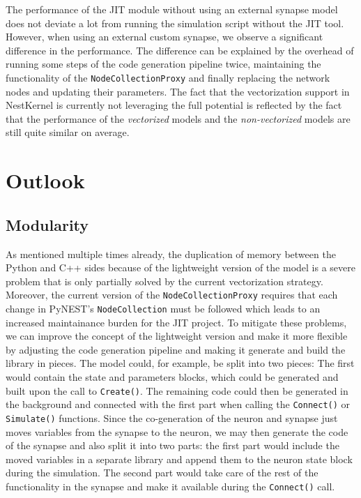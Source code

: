 The performance of the JIT module without using an external synapse model does not deviate a lot from running the simulation script without the JIT tool. However, when using an external custom synapse, we observe a significant difference in the performance. The difference can be explained by the overhead of running some steps of the code generation pipeline twice, maintaining the functionality of the \texttt{NodeCollectionProxy} and finally replacing the network nodes and updating their parameters. The fact that the vectorization support in NestKernel is currently not leveraging the full potential is reflected by the fact that the performance of the \emph{vectorized} models and the \emph{non-vectorized} models are still quite similar on average.

\section{Outlook}

\subsection*{Modularity}

As mentioned multiple times already, the duplication of memory between the Python and C++ sides because of the lightweight version of the model is a severe problem that is only partially solved by the current vectorization strategy. Moreover, the current version of the \texttt{NodeCollectionProxy} requires that each change in PyNEST's \texttt{NodeCollection} must be followed which leads to an increased maintainance burden for the JIT project. To mitigate these problems, we can improve the concept of the lightweight version and make it more flexible by adjusting the code generation pipeline and making it generate and build the library in pieces. The model could, for example, be split into two pieces: The first would contain the state and parameters blocks, which could be generated and built upon the call to \texttt{Create()}. The remaining code could then be generated in the background and connected with the first part when calling the \texttt{Connect()} or \texttt{Simulate()} functions. Since the co-generation of the neuron and synapse just moves variables from the synapse to the neuron, we may then generate the code of the synapse and also split it into two parts: the first part would include the moved variables in a separate library and append them to the neuron state block during the simulation. The second part would take care of the rest of the functionality in the synapse and make it available during the \texttt{Connect()} call.

